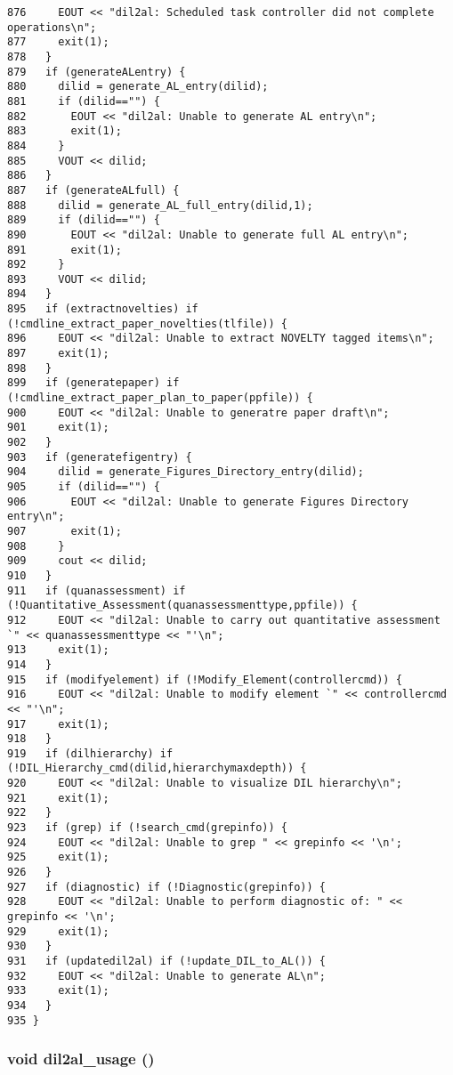 \begin{verbatim}
876     EOUT << "dil2al: Scheduled task controller did not complete operations\n";
877     exit(1);
878   }
879   if (generateALentry) {
880     dilid = generate_AL_entry(dilid);
881     if (dilid=="") {
882       EOUT << "dil2al: Unable to generate AL entry\n";
883       exit(1);
884     }
885     VOUT << dilid;
886   }
887   if (generateALfull) {
888     dilid = generate_AL_full_entry(dilid,1);
889     if (dilid=="") {
890       EOUT << "dil2al: Unable to generate full AL entry\n";
891       exit(1);
892     }
893     VOUT << dilid;
894   }
895   if (extractnovelties) if (!cmdline_extract_paper_novelties(tlfile)) {
896     EOUT << "dil2al: Unable to extract NOVELTY tagged items\n";
897     exit(1);
898   }
899   if (generatepaper) if (!cmdline_extract_paper_plan_to_paper(ppfile)) {
900     EOUT << "dil2al: Unable to generatre paper draft\n";
901     exit(1);
902   }
903   if (generatefigentry) {
904     dilid = generate_Figures_Directory_entry(dilid);
905     if (dilid=="") {
906       EOUT << "dil2al: Unable to generate Figures Directory entry\n";
907       exit(1);
908     }
909     cout << dilid;
910   }
911   if (quanassessment) if (!Quantitative_Assessment(quanassessmenttype,ppfile)) {
912     EOUT << "dil2al: Unable to carry out quantitative assessment `" << quanassessmenttype << "'\n";
913     exit(1);
914   }
915   if (modifyelement) if (!Modify_Element(controllercmd)) {
916     EOUT << "dil2al: Unable to modify element `" << controllercmd << "'\n";
917     exit(1);
918   }
919   if (dilhierarchy) if (!DIL_Hierarchy_cmd(dilid,hierarchymaxdepth)) {
920     EOUT << "dil2al: Unable to visualize DIL hierarchy\n";
921     exit(1);
922   }
923   if (grep) if (!search_cmd(grepinfo)) {
924     EOUT << "dil2al: Unable to grep " << grepinfo << '\n';
925     exit(1);
926   }
927   if (diagnostic) if (!Diagnostic(grepinfo)) {
928     EOUT << "dil2al: Unable to perform diagnostic of: " << grepinfo << '\n';
929     exit(1);
930   }
931   if (updatedil2al) if (!update_DIL_to_AL()) {
932     EOUT << "dil2al: Unable to generate AL\n";
933     exit(1);
934   }
935 }
\end{verbatim}\normalsize 
{}
\subsubsection{\setlength{\rightskip}{0pt plus 5cm}void dil2al\_\-usage ()}\label{dil2al_8cc_a111}




